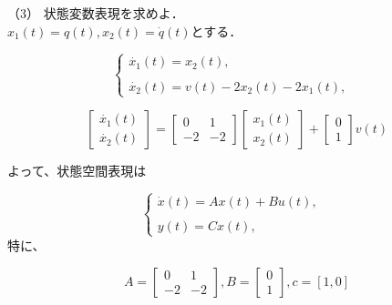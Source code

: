 \documentclass[xelatex,ja=standard,jafont=noto]{bxjsarticle}
\begin{document}
（3） 状態変数表現を求めよ．\\

$ x_{1}(t)=q(t),x_{2}(t)=\dot{q}(t) $とする．

\begin{equation}
\left\{
             \begin{array}{lr}
             \dot{x_{1}}(t)=x_{2}(t), & \\
             &\\
             \dot{x_{2}}(t)=v(t)-2x_{2}(t)-2x_{1}(t), & 
             \end{array}
\right.
\end{equation}

\begin{equation}
    {
\left[ \begin{array}{c}
\dot{x_{1}}(t)\\
\dot{x_{2}}(t)
\end{array}
\right ]}={
\left[ \begin{array}{cc}
0&1\\
-2&-2
\end{array}
\right ]}{
\left[ \begin{array}{c}
x_{1}(t)\\
x_{2}(t)
\end{array}
\right ]}
+{
\left[ \begin{array}{c}
0\\
1
\end{array}
\right ]}v(t)
\end{equation}

よって、状態空間表現は

\begin{equation}
\left\{
             \begin{array}{lr}
             \dot{x}(t)=Ax(t)+Bu(t), & \\
             &\\
             y(t)=Cx(t), & 
             \end{array}
\right.
\end{equation}
特に、

\begin{equation}
A={
\left[ \begin{array}{cc}
0&1\\
-2&-2
\end{array}
\right ]},B={
\left[ \begin{array}{c}
0\\
1
\end{array}
\right ]},c=[1,0]
\end{equation}
\end{document}
